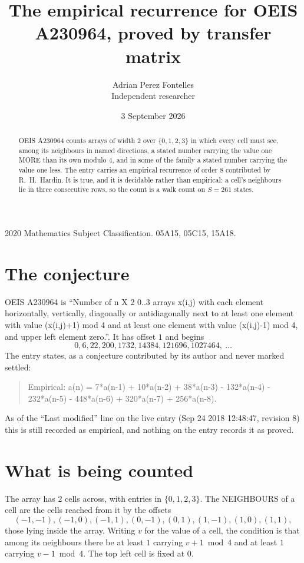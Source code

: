 \documentclass[11pt,a4paper]{article}
\title{The empirical recurrence for OEIS A230964, proved by transfer matrix}
\author{Adrian Perez Fontelles\\ \small Independent researcher}
\date{3 September 2026}
\theoremstyle{plain}
\theoremstyle{definition}
\begin{document}
\maketitle

\begin{abstract}
OEIS A230964 counts arrays of width $2$ over $\{0,1,2,3\}$ in which every cell must see, among its
neighbours in named directions, a stated number carrying the value one MORE than its own
modulo $4$, and in some of the family a stated number carrying the value one less. The entry
carries an empirical recurrence of order $8$ contributed by R.~H.~Hardin. It is true, and
it is decidable rather than empirical: a cell's neighbours lie in three consecutive rows, so
the count is a walk count on $S=261$ states.
\end{abstract}

\noindent\small 2020 Mathematics Subject Classification. 05A15, 05C15, 15A18.\normalsize

\section{The conjecture}

OEIS A230964 is ``Number of n X 2 0..3 arrays x(i,j) with each element horizontally, vertically, diagonally or antidiagonally next to at least one element with value (x(i,j)+1) mod 4 and at least one element with value (x(i,j)-1) mod 4, and upper left element zero.''. It has offset $1$ and begins
\[
0, 6, 22, 200, 1732, 14384, 121696, 1027464,\ \dots
\]
The entry states, as a conjecture contributed by its author and never marked settled:
\begin{quote}
Empirical: a(n) = 7*a(n-1) + 10*a(n-2) + 38*a(n-3) - 132*a(n-4) - 232*a(n-5) - 448*a(n-6) + 320*a(n-7) + 256*a(n-8).
\end{quote}
As of the ``Last modified'' line on the live entry (Sep 24 2018 12:48:47, revision 8) this is still
recorded as empirical, and nothing on the entry records it as proved.

\section{What is being counted}

The array has $2$ cells across, with entries in $\{0,1,2,3\}$. The NEIGHBOURS of a cell are the
cells reached from it by the offsets
\[
(-1,-1), (-1,0), (-1,1), (0,-1), (0,1), (1,-1), (1,0), (1,1),
\]
those lying inside the array. Writing $v$ for the value of a cell, the condition is that among
its neighbours there be at least $1$ carrying $v+1 \bmod 4$ and at least $1$ carrying $v-1 \bmod 4$. The top left
cell is fixed at $0$.
\end{document}
